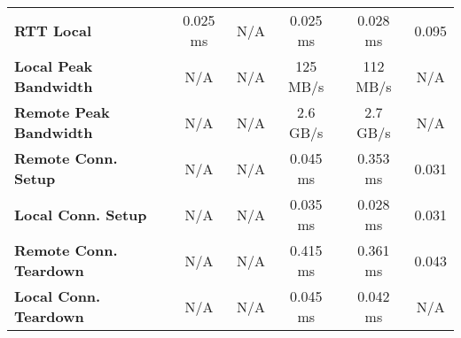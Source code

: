 \begin{table}[ht]
\begin{threeparttable}
\begin{tabular}{lccccc}
  \textbf{RTT Local}  & 0.025 ms & N/A & 0.025 ms & 0.028 ms & 0.095 \\
  \textbf{Local Peak Bandwidth}  & N/A & N/A & 125 MB/s & 112 MB/s & N/A\\
  \textbf{Remote Peak Bandwidth} & N/A & N/A & 2.6 GB/s & 2.7 GB/s & N/A \\
  \textbf{Remote Conn. Setup}  & N/A & N/A & 0.045 ms & 0.353 ms & 0.031 \\
  \textbf{Local Conn. Setup}  & N/A & N/A & 0.035 ms & 0.028 ms & 0.031 \\
  \textbf{Remote Conn. Teardown}  & N/A & N/A & 0.415 ms & 0.361 ms & 0.043 \\
  \textbf{Local Conn. Teardown}  & N/A & N/A & 0.045 ms & 0.042 ms & N/A \\

  \hline
  \end{tabular}
  \end{threeparttable}
  \label{Summary_Table}
\end{table}
